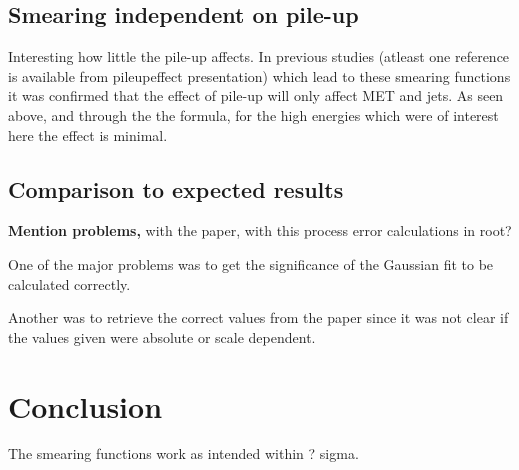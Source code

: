 \subsection{Smearing independent on pile-up}
Interesting how little the pile-up affects. In previous studies (atleast one reference is available from pileupeffect presentation) which lead to these smearing functions it was confirmed that the effect of pile-up will only affect MET and jets. As seen above, and through the the formula, for the high energies which were of interest here the effect is minimal. 
\subsection{Comparison to expected results}
\textbf{Mention problems,} with the paper, with this process error calculations in root?

One of the major problems was to get the significance of the Gaussian fit to be calculated correctly.

Another was to retrieve the correct values from the paper since it was not clear if the values given were absolute or scale dependent.
\section{Conclusion}
The smearing functions work as intended within ? sigma. 
